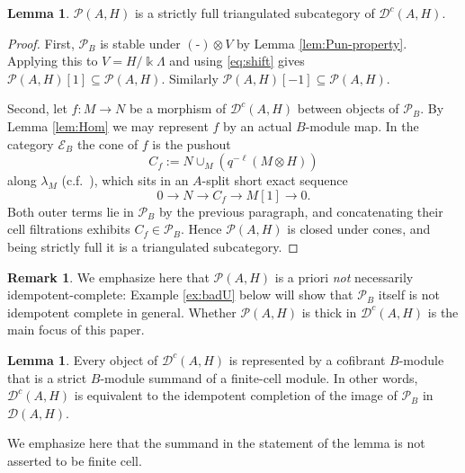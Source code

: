 \documentclass[11pt]{article}
\theoremstyle{definition}
\newtheorem{lem}[thm]{Lemma}
\newtheorem{rem}[thm]{Remark}
\numberwithin{equation}{section}
\newcommand{\Pun}{\mathcal{P}_B}
\newcommand{\Tcat}{\mathcal{P}(A,H)}
\newcommand{\Dc}{\mathcal{D}^c(A,H)}
\newcommand{\Der}{\mathcal{D}}
\newcommand{\Ecat}{\mathcal{E}_B}
\begin{document}
\begin{lem}\label{lem:T-triangulated}
$\Tcat$ is a strictly full triangulated subcategory of $\Dc$.
\end{lem}

\begin{proof}
First, $\Pun$ is stable under $(\mbox{-})\otimes V$ by Lemma \ref{lem:Pun-property}. Applying this to $V=H/\Bbbk\Lambda$ and using \eqref{eq:shift} gives $\Tcat[1]\subseteq\Tcat$. Similarly $\Tcat[-1]\subseteq\Tcat$.

Second, let $f:M\to N$ be a morphism of $\Dc$ between objects of $\Pun$.  By Lemma \ref{lem:Hom} we may represent $f$ by an actual $B$-module map.  In the category $\Ecat$ the cone of $f$ is the pushout 
$$C_f:=N\cup_M\left(q^{-\ell}(M\otimes H)\right)$$ along $\lambda_M$ (c.f.~\cite[Definition 3.2]{QYHopf}), which sits in an $A$-split short exact sequence
\[
0\longrightarrow N\longrightarrow C_f\longrightarrow M[1]\longrightarrow 0 .
\]
Both outer terms lie in $\Pun$ by the previous paragraph, and concatenating their cell filtrations exhibits $C_f\in\Pun$.  Hence $\Tcat$ is closed under cones, and being strictly full it is a triangulated subcategory.
\end{proof}

\begin{rem}
We emphasize here that $\Tcat$ is a priori \emph{not} necessarily idempotent-complete: Example \ref{ex:badU} below will show that $\Pun$ itself is not idempotent complete in general. Whether $\Tcat$ is thick in $\Dc$ is the main focus of this paper.
\end{rem}


\begin{lem}\label{lem:finite-cofibrant-model}
Every object of $\Dc$ is represented by a cofibrant $B$-module that is a strict $B$-module summand of a finite-cell module. In other words, $\Dc$ is equivalent to the idempotent completion of the image of $\Pun$ in $\Der(A,H)$.
\end{lem}

We emphasize here that the
summand in the statement of the lemma is not asserted to be finite cell.
\end{document}
